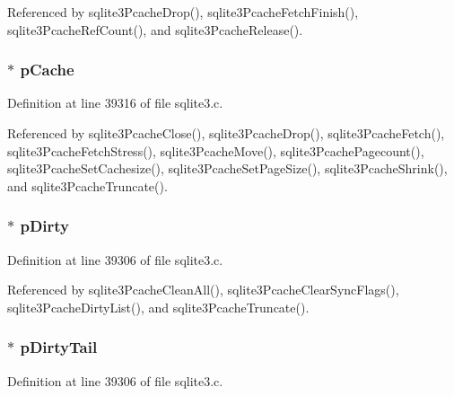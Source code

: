 Referenced by sqlite3\+Pcache\+Drop(), sqlite3\+Pcache\+Fetch\+Finish(), sqlite3\+Pcache\+Ref\+Count(), and sqlite3\+Pcache\+Release().

\hypertarget{struct_p_cache_afece038fa661865d1239cf93718779b0}{}
\subsubsection[{p\+Cache}]{$\ast$ p\+Cache}\label{struct_p_cache_afece038fa661865d1239cf93718779b0}


Definition at line 39316 of file sqlite3.\+c.



Referenced by sqlite3\+Pcache\+Close(), sqlite3\+Pcache\+Drop(), sqlite3\+Pcache\+Fetch(), sqlite3\+Pcache\+Fetch\+Stress(), sqlite3\+Pcache\+Move(), sqlite3\+Pcache\+Pagecount(), sqlite3\+Pcache\+Set\+Cachesize(), sqlite3\+Pcache\+Set\+Page\+Size(), sqlite3\+Pcache\+Shrink(), and sqlite3\+Pcache\+Truncate().

\hypertarget{struct_p_cache_a2997dc2dc0dd03fdd59937ca5a4eef8a}{}
\subsubsection[{p\+Dirty}]{$\ast$ p\+Dirty}\label{struct_p_cache_a2997dc2dc0dd03fdd59937ca5a4eef8a}


Definition at line 39306 of file sqlite3.\+c.



Referenced by sqlite3\+Pcache\+Clean\+All(), sqlite3\+Pcache\+Clear\+Sync\+Flags(), sqlite3\+Pcache\+Dirty\+List(), and sqlite3\+Pcache\+Truncate().

\hypertarget{struct_p_cache_a1163420b8b2b20ac8b58adfe9273054b}{}
\subsubsection[{p\+Dirty\+Tail}]{ $\ast$ p\+Dirty\+Tail}\label{struct_p_cache_a1163420b8b2b20ac8b58adfe9273054b}


Definition at line 39306 of file sqlite3.\+c.



